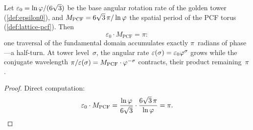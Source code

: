 \begin{Proposition}\label{prop:certainty}
Let $\varepsilon_0 = \ln\varphi/(6\sqrt{3})$ be the base angular rotation
rate of the golden tower (\cref{def:epsilon0}), and
$M_{\mathrm{PCF}} = 6\sqrt{3}\,\pi/\ln\varphi$ the spatial period of the
PCF torus (\cref{def:lattice-pcf}).  Then
\begin{equation}\label{eq:certainty-principle}
  \varepsilon_0 \cdot M_{\mathrm{PCF}} = \pi:
\end{equation}
one traversal of the fundamental domain accumulates exactly $\pi$~radians
of phase---a half-turn.  At tower level~$\sigma$, the angular rate
$\varepsilon(\sigma)=\varepsilon_0\varphi^\sigma$ grows while the conjugate
wavelength $\pi/\varepsilon(\sigma) = M_{\mathrm{PCF}}\cdot\varphi^{-\sigma}$
contracts, their product remaining~$\pi$.
\end{Proposition}

\begin{proof}
Direct computation:
\[
  \varepsilon_0\cdot M_{\mathrm{PCF}}
  = \frac{\ln\varphi}{6\sqrt{3}}
    \cdot\frac{6\sqrt{3}\,\pi}{\ln\varphi}
  = \pi.
\]
\end{proof}

